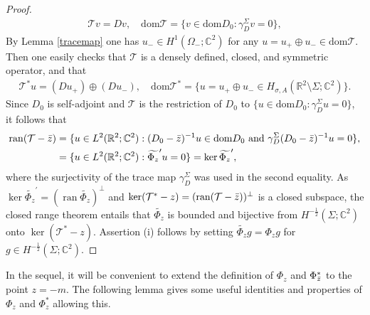 \documentclass[11pt,a4paper,reqno,oneside]{amsproc}
\DeclareMathOperator{\dom}{dom}
\DeclareMathOperator{\ran}{ran}
\def \rr {{\mathbb R}}
\def \cc {{\mathbb C}}
\numberwithin{equation}{section}
\def\dom{\mathrm{dom}}
\def \cc {{\mathbb{C}}}
\begin{document}
\begin{proof}
\begin{equation*}%
  \begin{split}
    \mathcal T v = D v, \quad    \dom \mathcal T =\{v\in\dom D_0: \gamma_D^\Sigma v=0 \},
  \end{split}
\end{equation*}
 By Lemma \ref{tracemap} one has $u_-\in H^1(\Omega_-;\cc^2)$ for any $u=u_+\oplus u_-\in\dom \mathcal T$. Then one easily checks that $\mathcal T$ is a densely defined, closed, and symmetric operator, and that 
 \begin{equation*}%
  \begin{split}
    \mathcal T^\ast u = (Du_+)\oplus(D u_-),\quad \dom \mathcal T^\ast =\{u=u_+\oplus u_-\in H_{\sigma, A}(\rr^2\setminus\Sigma;\cc^2) \}.
  \end{split}
\end{equation*}
Since $D_0$ is self-adjoint and $\mathcal T$ is the restriction of $D_0$ to $\{u\in\dom D_0: \gamma_D^\Sigma u=0 \}$, it follows that 
 \begin{align*}
     \ran (\mathcal T-\Bar{z})&= \{u\in L^2(\rr^2;\cc^2):  (D_0-\Bar{z})^{-1}u\in\dom D_0 \text{ and } \gamma_D^\Sigma (D_0-\Bar{z})^{-1}u=0 \},\\
     &= \{u\in L^2(\rr^2;\cc^2):  \widetilde{\Phi_{z}}^{\prime}u=0 \}= \ker \widetilde{\Phi_{z}}^{\prime},
 \end{align*}
where the surjectivity of the trace map $\gamma_D^\Sigma$ was used in the second equality. As  $\ker \widetilde{\Phi_{z}}^{\prime}=(\ran  \widetilde{\Phi_{z}})^{\bot}$ and  $\ker(\mathcal T^\ast-z)=(\ran(\mathcal T-\Bar{z}))^\bot$ is a closed subspace,  the closed range theorem entails that $\widetilde{\Phi_z}$ is bounded and bijective from $H^{-\frac{1}{2}}(\Sigma;\mathbb{C}^2)$ onto $\ker(\mathcal T^\ast-z)$. Assertion (i) follows by setting $\widetilde{\Phi_z}g=\Phi_z g$ for $g\in H^{-\frac{1}{2}}(\Sigma;\mathbb{C}^2)$.        
\end{proof}

In the sequel, it will be convenient to extend the definition of $\Phi_z$ and $\Phi_{\Bar{z}}^\ast$ to the point  $z=-m$.  The following lemma gives some useful identities and properties of $\Phi_z$ and $\Phi_z^\ast$ allowing this.
\end{document}
